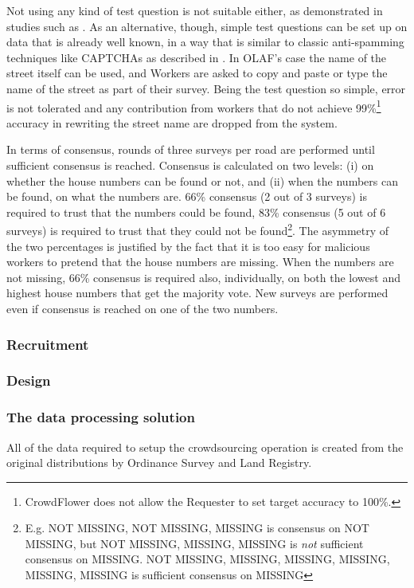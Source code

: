         Not using any kind of test question is not suitable either, as demonstrated in studies such as \cite{DellaPenna:tf}. As an alternative, though, simple test questions can be set up on data that is already well known, in a way that is similar to classic anti-spamming techniques like CAPTCHAs as described in \cite{Difallah:2012ty}. In OLAF's case the name of the street itself can be used, and Workers are asked to copy and paste or type the name of the street as part of their survey. Being the test question so simple, error is not tolerated and any contribution from workers that do not achieve 99\%\footnote{CrowdFlower does not allow the Requester to set target accuracy to 100\%.} accuracy in rewriting the street name are dropped from the system.

        In terms of consensus, rounds of three surveys per road are performed until sufficient consensus is reached. Consensus is calculated on two levels: (i) on whether the house numbers can be found or not, and (ii) when the numbers can be found, on what the numbers are. 66\% consensus (2 out of 3 surveys) is required to trust that the numbers could be found, 83\% consensus (5 out of 6 surveys) is required to trust that they could not be found\footnote{E.g. { NOT MISSING, NOT MISSING, MISSING } is consensus on NOT MISSING, but { NOT MISSING, MISSING, MISSING } is {\it not} sufficient consensus on MISSING. { NOT MISSING, MISSING, MISSING, MISSING, MISSING, MISSING } is sufficient consensus on MISSING}. The asymmetry of the two percentages is justified by the fact that it is too easy for malicious workers to pretend that the house numbers are missing. When the numbers are not missing, 66\% consensus is required also, individually, on both the lowest and highest house numbers that get the majority vote. New surveys are performed even if consensus is reached on one of the two numbers.
    
    \subsubsection{Recruitment}
    \subsubsection{Design}
    \subsubsection{The data processing solution}

        All of the data required to setup the crowdsourcing operation is created from the original distributions by Ordinance Survey and Land Registry. 
        
